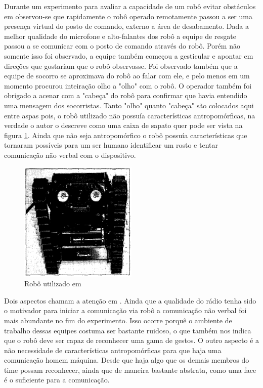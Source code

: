 \documentclass[
	article,			%
	11pt,				%
	oneside,			%
	a4paper,			%
	english,			%
	brazil,				%
	sumario=tradicional	
	]{abntex2}
\begin{document}
Durante um experimento para avaliar a capacidade de um robô evitar obstáculos em \cite{fin2004} observou-se que rapidamente o robô operado remotamente passou a ser uma presença virtual do posto de comando, externo a área de desabamento. Dada a melhor qualidade do microfone e alto-falantes dos robô a equipe de resgate passou a se comunicar com o posto de comando através do robô. Porém não somente isso foi observado, a equipe também começou a gesticular e apontar em direções que gostariam que o robô observasse. Foi observado também que a equipe de socorro se aproximava do robô ao falar com ele, e pelo menos em um momento procurou inteiração olho a "olho" com o robô. O operador também foi obrigado a acenar com a "cabeça" do robô para confirmar que havia entendido uma mensagem dos socorristas. Tanto "olho" quanto "cabeça" são colocados aqui entre aspas pois, o robô utilizado não possuía características antropomórficas, na verdade o autor o descreve como uma caixa de sapato quer pode ser vista na figura \ref{figure:caixa_sapato}. Ainda que não seja antropomórfico o robô possuía características que tornaram possíveis para um ser humano identificar um rosto e tentar comunicação não verbal com o dispositivo.

\begin{figure}
\centering
\includegraphics[width=0.5\textwidth]{robo-nao-antropomorfico.png} 
\caption{Robô utilizado em }
\label{figure:caixa_sapato}
\end{figure}

Dois aspectos chamam a atenção em \cite{fin2004}. Ainda que a qualidade do rádio tenha sido o motivador para iniciar a comunicação via robô a comunicação não verbal foi mais abundante no fim do experimento. Isso ocorre porquê o ambiente de trabalho dessas equipes costuma ser bastante ruidoso, o que também nos indica que o robô deve ser capaz de reconhecer uma gama de gestos. O outro aspecto é a não necessidade de características antropomórficas para que haja uma comunicação homem máquina. Desde que haja algo que os demais membros do time possam reconhecer, ainda que de maneira bastante abstrata, como uma face é o suficiente para a comunicação.
\end{document}
